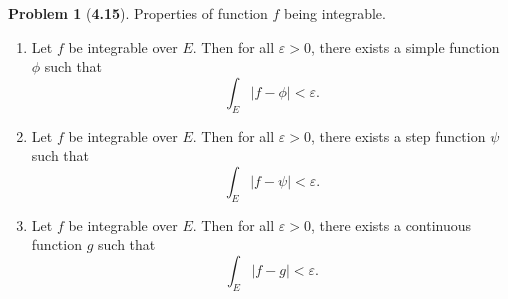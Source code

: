 \documentclass[12pt]{article}
\renewcommand{\epsilon}{\varepsilon}
\theoremstyle{definition}
\newtheorem{problem}{Problem}
\begin{document}
\begin{problem}[\textbf{4.15}]
    Properties of function \( f \) being integrable.
    \begin{enumerate}[label = (\alph{*})]
        \item Let \( f \) be integrable over \( E \). Then for all \( \epsilon > 0 \), there exists a simple function \( \phi \) such that 
            \[
            \int_{E} \left| f - \phi \right| < \epsilon.
            \]
        \item Let \( f \) be integrable over \( E \). Then for all \( \epsilon > 0 \), there exists a step function \( \psi \) such that 
            \[ 
            \int_{E} \left| f - \psi \right| < \epsilon.
            \]
        \item Let \( f \) be integrable over \( E \). Then for all \( \epsilon > 0 \), there exists a continuous function \( g \) such that 
            \[ 
            \int_{E} \left| f - g \right| < \epsilon.
            \]
    \end{enumerate}
\end{problem}
\end{document}
